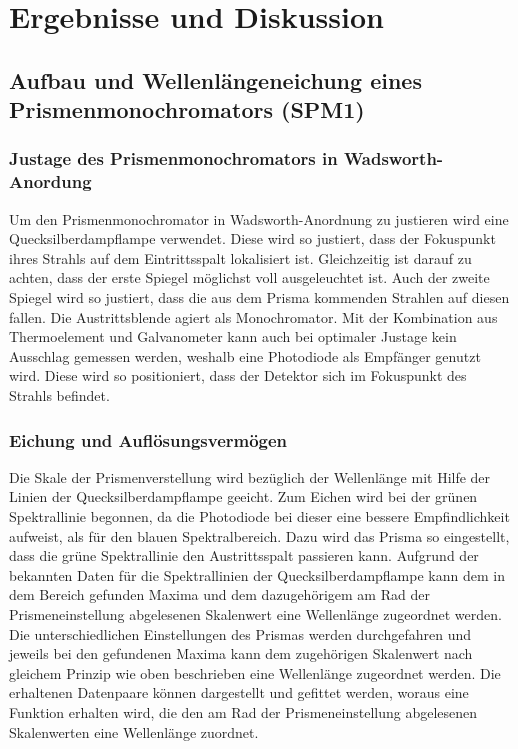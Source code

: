 \documentclass[a4paper,twoside,final]{article}
\begin{document}
\section{Ergebnisse und Diskussion}\label{sec:ErgebnisseUndDiskussion}
% 
\subsection{Aufbau und Wellenlängeneichung eines Prismenmonochromators (SPM1)}
\subsubsection{Justage des Prismenmonochromators in Wadsworth-Anordung}
Um den Prismenmonochromator in Wadsworth-Anordnung zu justieren wird eine Quecksilberdampflampe verwendet. Diese wird so justiert, dass der Fokuspunkt ihres Strahls auf dem Eintrittsspalt lokalisiert ist. Gleichzeitig ist darauf zu achten, dass der erste Spiegel möglichst voll ausgeleuchtet ist. Auch der zweite Spiegel wird so justiert, dass die aus dem Prisma kommenden Strahlen auf diesen fallen. Die Austrittsblende agiert als Monochromator. Mit der Kombination aus Thermoelement und Galvanometer kann auch bei optimaler Justage kein Ausschlag gemessen werden, weshalb eine Photodiode als Empfänger genutzt wird. Diese wird so positioniert, dass der Detektor sich im Fokuspunkt des Strahls befindet.

\subsubsection{Eichung und Auflösungsvermögen}
Die Skale der Prismenverstellung wird bezüglich der Wellenlänge mit Hilfe der Linien der Quecksilberdampflampe geeicht. Zum Eichen wird bei der grünen Spektrallinie begonnen, da die Photodiode bei dieser eine bessere Empfindlichkeit aufweist, als für den blauen Spektralbereich. Dazu wird das Prisma so eingestellt, dass die grüne Spektrallinie den Austrittsspalt passieren kann. Aufgrund der bekannten Daten für die Spektrallinien der Quecksilberdampflampe kann dem in dem Bereich gefunden Maxima und dem dazugehörigem am Rad der Prismeneinstellung abgelesenen Skalenwert eine Wellenlänge zugeordnet werden. Die unterschiedlichen Einstellungen des Prismas werden durchgefahren und jeweils bei den gefundenen Maxima kann dem zugehörigen Skalenwert nach gleichem Prinzip wie oben beschrieben eine Wellenlänge zugeordnet werden. Die erhaltenen Datenpaare können dargestellt und gefittet werden, woraus eine Funktion erhalten wird, die den am Rad der Prismeneinstellung abgelesenen Skalenwerten eine Wellenlänge zuordnet.
\end{document}
